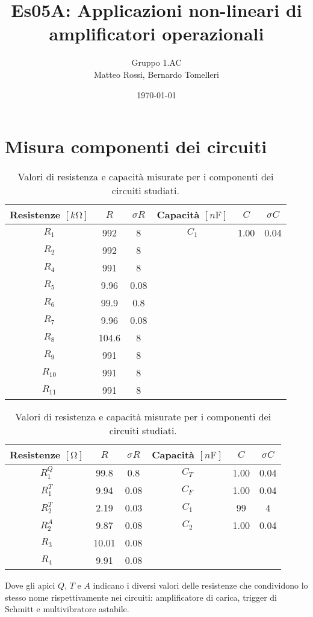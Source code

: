 \documentclass[10pt, a4paper, italian]{article}
\author{Gruppo 1.AC \\ Matteo Rossi, Bernardo Tomelleri}
\title{Es05A: Applicazioni non-lineari di amplificatori operazionali}
\begin{document}
\date{\today}
\maketitle

\setcounter{section}{0}

\section*{Misura componenti dei circuiti}
\begin{table}[htbp]
\centering
\begin{tabular}{cccccc}
\toprule
Resistenze $[\si{k\ohm}]$ & $R$ & $\sigma R$ & Capacità $[\si{n\F}]$ & $C$ &
$\sigma C$ \\
\midrule
\midrule
$R_1$	  	& 992 	& 8		& $C_1$ & 1.00	& 0.04 \\
$R_2$	  	& 992	& 8		& & & \\
$R_4$	  	& 991	& 8		& & & \\
$R_5$	  	& 9.96	& 0.08	& & & \\
$R_6$	  	& 99.9	& 0.8	& & & \\
$R_7$	  	& 9.96	& 0.08		& & & \\
$R_8$	  	& 104.6	& 8		& & & \\
$R_9$	  	& 991	& 8		& & & \\
$R_{10}$  	& 991	& 8		& & & \\
$R_{11}$  	& 991	& 8		& & & \\
\bottomrule     
\end{tabular}
\caption{Valori di resistenza e capacità misurate per i componenti dei
circuiti studiati. \label{tab: rcmes_B}}

\begin{tabular}{cccccc}
\toprule
Resistenze $[\si{\ohm}]$ & $R$ & $\sigma R$ & Capacità $[\si{n\F}]$ & $C$ &
$\sigma C$ \\
\midrule
\midrule
$R_1^Q$	  & 99.8 	& 0.8 	 & $C_T$ & 1.00		 & 0.04 \\
$R_1^T$	  & 9.94	& 0.08 	 & $C_F$ & 1.00		 & 0.04 \\
$R_2^T$	  & 2.19	& 0.03	 & $C_1$ & 99		 & 4	\\
$R_2^A$	  & 9.87		& 0.08		 & $C_2$ & 1.00		 & 0.04 \\
$R_3$	  & 10.01		& 0.08		 & & & \\
$R_4$	  & 9.91		& 0.08		 & & & \\
\bottomrule     
\end{tabular}
\caption{Valori di resistenza e capacità misurate per i componenti dei
circuiti studiati. \label{tab: rcmes_M}}
\end{table}
Dove gli apici $Q$, $T$ e $A$ indicano i diversi valori delle resistenze che
condividono lo stesso nome rispettivamente nei circuiti:
amplificatore di carica, trigger di Schmitt e multivibratore astabile.
\end{document}
